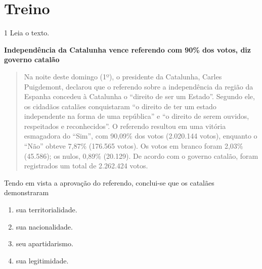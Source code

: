 
\section{Treino}

\num{1} Leia o texto.

\textbf{Independência da Catalunha vence referendo com 90\% dos votos, diz governo catalão}

\begin{quote}
Na noite deste domingo (1º), o presidente da Catalunha, Carles
Puigdemont, declarou que o referendo sobre a independência da região da
Espanha concedeu à Catalunha o ``direito de ser um Estado''. Segundo
ele, os cidadãos catalães conquistaram ``o direito de ter um estado
independente na forma de uma república'' e ``o direito de serem ouvidos,
respeitados e reconhecidos''. O referendo resultou em uma vitória
esmagadora do ``Sim'', com 90,09\% dos votos (2.020.144 votos), enquanto
o ``Não'' obteve 7,87\% (176.565 votos). Os votos em branco foram 2,03\%
(45.586); os nulos, 0,89\% (20.129). De acordo com o governo catalão,
foram registrados um total de 2.262.424 votos.
\end{quote}


Tendo em vista a aprovação do referendo, conclui-se que os catalães
demonstraram

\begin{enumerate}
\def\labelenumi{\alph{enumi})}
\item
  sua territorialidade.
\item
  sua nacionalidade.
\item
  seu apartidarismo.
\item
  sua legitimidade.
\end{enumerate}

